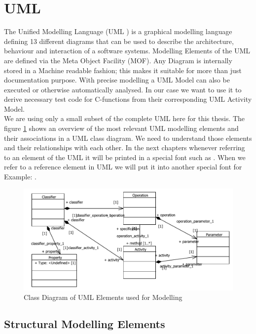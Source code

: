\section{UML}
\label{sec:UML}
The Unified Modelling Language (UML \texttrademark ) is a graphical modelling language defining 13 different diagrams that can be used to describe the architecture, behaviour and interaction of a software systems. Modelling Elements of the UML are defined via the Meta Object Facility (MOF). Any Diagram is internally stored in a Machine readable fashion; this makes it suitable for more than just documentation purpose. With precise modelling a UML Model can also be executed or otherwise automatically analysed. In our case we want to use it to derive necessary test code for C-functions from their corresponding UML Activity Model. \\ We are using only a small subset of the complete UML here for this thesis. The figure \ref{relevantUMLClassDiagram} shows an overview of the most relevant UML modelling elements and their associations in a UML class diagram. We need to understand those elements and their relationships with each other. In the next chapters whenever referring to an element of the UML it will be printed in a special font such as . When we refer to a reference element in UML we will put it into another special font for Example: .
\begin{figure}\label{relevantUMLClassDiagram}
\includegraphics[width=\textwidth]{./pics/relevantUML.pdf}
\caption{Class Diagram of UML Elements used for Modelling}
\end{figure}
\subsection{Structural Modelling Elements}
